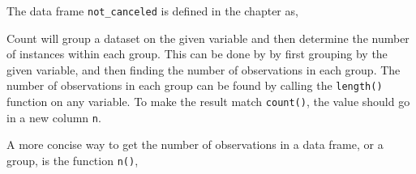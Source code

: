 \documentclass[]{book}
\newenvironment{Shaded}{\begin{snugshade}}{\end{snugshade}}
\newcommand{\CommentTok}[1]{\textcolor[rgb]{0.56,0.35,0.01}{\textit{#1}}}
\newcommand{\DataTypeTok}[1]{\textcolor[rgb]{0.13,0.29,0.53}{#1}}
\newcommand{\KeywordTok}[1]{\textcolor[rgb]{0.13,0.29,0.53}{\textbf{#1}}}
\newcommand{\NormalTok}[1]{#1}
\newcommand{\OperatorTok}[1]{\textcolor[rgb]{0.81,0.36,0.00}{\textbf{#1}}}
\newcommand{\StringTok}[1]{\textcolor[rgb]{0.31,0.60,0.02}{#1}}
\theoremstyle{plain}
\theoremstyle{remark}
\begin{document}
The data frame \texttt{not\_canceled} is defined in the chapter as,

\begin{Shaded}
\end{Shaded}

Count will group a dataset on the given variable and then determine the number of instances within each group.
This can be done by by first grouping by the given variable, and then finding the number of observations in each group.
The number of observations in each group can be found by calling the \texttt{length()} function on any variable.
To make the result match \texttt{count()}, the value should go in a new column \texttt{n}.

\begin{Shaded}
\end{Shaded}

A more concise way to get the number of observations in a data frame, or a group, is the function \texttt{n()},

\begin{Shaded}
\end{Shaded}
\end{document}
